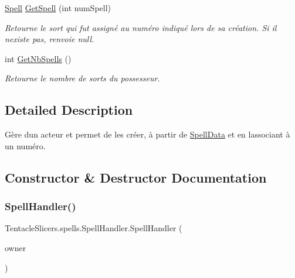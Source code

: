 \begin{DoxyCompactItemize}
\hyperlink{class_tentacle_slicers_1_1spells_1_1_spell}{Spell} \hyperlink{class_tentacle_slicers_1_1spells_1_1_spell_handler_aa5c435cd7e2f44e3988c7aff1d0814b3}{Get\+Spell} (int num\+Spell)
\begin{DoxyCompactList}\small\item\em Retourne le sort qui fut assigné au numéro indiqué lors de sa création. Si il n\textquotesingle{}existe pas, renvoie null. \end{DoxyCompactList}\item 
int \hyperlink{class_tentacle_slicers_1_1spells_1_1_spell_handler_add51cb1ca45f894e63c46d7f9a8d56d3}{Get\+Nb\+Spells} ()
\begin{DoxyCompactList}\small\item\em Retourne le nombre de sorts du possesseur. \end{DoxyCompactList}\end{DoxyCompactItemize}


\subsection{Detailed Description}
Gère d\textquotesingle{}un acteur et permet de les créer, à partir de \hyperlink{class_tentacle_slicers_1_1spells_1_1_spell_data}{Spell\+Data} et en l\textquotesingle{}associant à un numéro. 



\subsection{Constructor \& Destructor Documentation}
\mbox{\label{class_tentacle_slicers_1_1spells_1_1_spell_handler_a7a51dff0edbbc1c0c6ac99af89c4b757}} 
\subsubsection{\texorpdfstring{Spell\+Handler()}{SpellHandler()}}
{\footnotesize\ttfamily Tentacle\+Slicers.\+spells.\+Spell\+Handler.\+Spell\+Handler (\begin{DoxyParamCaption}\item[{\hyperlink{class_tentacle_slicers_1_1actors_1_1_controlled_actor}{Controlled\+Actor}}]{owner }\end{DoxyParamCaption})}



